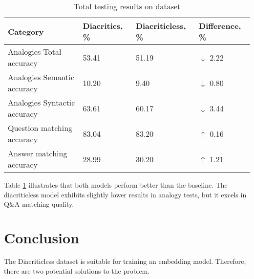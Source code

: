 \documentclass{article}
\begin{document}
\begin{table}[h]
  \centering
  \begin{tabular}{ |p{4.5cm}||p{2cm}|p{2.4cm}|p{2.1cm}|  }
    \hline
    Category                     & Diacritics, \% & Diacriticless, \% & Difference, \%    \\
    \hline
    Analogies Total accuracy     & 53.41          & 51.19             & $\downarrow$ 2.22 \\
    Analogies Semantic accuracy  & 10.20          & 9.40              & $\downarrow$ 0.80 \\
    Analogies Syntactic accuracy & 63.61          & 60.17             & $\downarrow$ 3.44 \\
    \hline                    
    Question matching accuracy   & 83.04          & 83.20             & $\uparrow$ 0.16   \\
    Answer matching accuracy     & 28.99          & 30.20             & $\uparrow$ 1.21   \\
    \hline
  \end{tabular}
  \caption{Total testing results on dataset}
  \label{Comparison}  
\end{table}


Table \ref{Comparison} illustrates that both models perform better than the baseline.
The diacriticless model exhibits slightly lower results in analogy tests, but it excels in Q\&A matching quality.

\section{Conclusion} 
The Diacriticless dataset is suitable for training an embedding model.
Therefore, there are two potential solutions to the problem.
\end{document}
